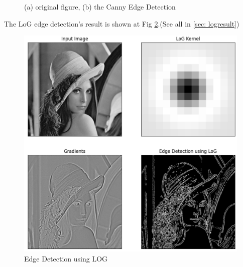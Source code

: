 \documentclass[final]{cvpr}
\begin{document}
\begin{figure}[h]
\centering
{}
\quad
{}
\caption{(a) original figure, (b) the Canny Edge Detection}
\label{fig:canny}
\end{figure}
The LoG edge detection's result is shown at Fig \ref{fig: log}.(See all in \ref{sec: logresult})


\begin{figure}[htbp]
\centering

\includegraphics[width=0.7\linewidth]{11.png}

\caption{Edge Detection using LOG}
\label{fig: log}
\end{figure}
\end{document}
